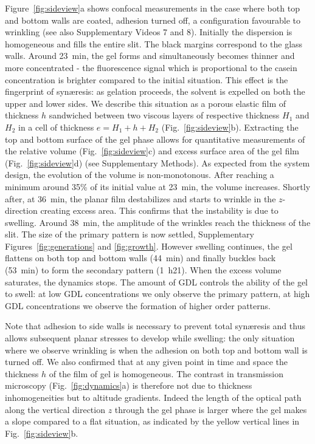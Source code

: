 \documentclass[twocolumn,superscriptaddress,showpacs,preprintnumbers,
amsmath,amssymb,prl]{revtex4-1}
\begin{document}
Figure~\ref{fig:sideview}a shows confocal measurements in the case where both top and bottom walls are coated, adhesion turned off, a configuration favourable to wrinkling (see also Supplementary Videos 7 and 8). Initially the dispersion is homogeneous and fills the entire slit. The black margins correspond to the glass walls. Around \SI{23}{\minute}, the gel forms and simultaneously becomes thinner and more concentrated - the fluorescence signal which is proportional to the casein concentration is brighter compared to the initial situation. This effect is the fingerprint of syn\ae{}resis: as gelation proceeds, the solvent is expelled on both the upper and lower sides. We describe this situation as a porous elastic film of thickness $h$ sandwiched between two viscous layers of respective thickness $H_1$ and $H_2$ in a cell of thickness $e=H_1+h+H_2$ (Fig.~\ref{fig:sideview}b). Extracting the top and bottom surface of the gel phase allows for quantitative measurements of the relative volume (Fig.~\ref{fig:sideview}c) and excess surface area of the gel film (Fig.~\ref{fig:sideview}d) (see Supplementary Methods). As expected from the system design, the evolution of the volume is non-monotonous. After reaching a minimum around 35\% of its initial value at \SI{23}{\minute}, the volume increases. Shortly after,  at \SI{36}{\minute}, the planar film destabilizes and starts to wrinkle in the $z$-direction creating excess area. This confirms that the instability is due to swelling. Around \SI{38}{\minute}, the amplitude of the wrinkles reach the thickness of the slit. The size of the primary pattern is now settled, Supplementary Figures~\ref{fig:generations} and \ref{fig:growth}. However swelling continues, the gel flattens on both top and bottom walls (\SI{44}{\minute}) and finally buckles back (\SI{53}{\minute}) to form the secondary pattern (\SI{1}{\hour}21). When the excess volume saturates, the dynamics stops. The amount of GDL controls the ability of the gel to swell: at low GDL concentrations we only observe the primary pattern, at high GDL concentrations we observe the formation of higher order patterns. 

Note that adhesion to side walls is necessary to prevent total syn\ae{}resis and thus allows subsequent planar stresses to develop while swelling: the only situation where we observe wrinkling is when the adhesion on both top and bottom wall is turned off. We also confirmed that at any given point in time and space the thickness $h$ of the film of gel is homogeneous. The contrast in transmission microscopy (Fig.~\ref{fig:dynamics}a) is therefore not due to thickness inhomogeneities but to altitude gradients. Indeed the length of the optical path along the vertical direction $z$ through the gel phase is larger where the gel makes a slope compared to a flat situation, as indicated by the yellow vertical lines in Fig.~\ref{fig:sideview}b.
\end{document}
